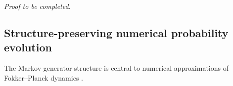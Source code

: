 \documentclass[12pt,a4paper,oneside]{book}
\begin{document}

\noindent\textit{Proof to be completed.}



\subsection{Structure-preserving numerical probability evolution}
\label{subsec:numerical}\label{ch:numerical}
The Markov generator structure is central to numerical approximations of Fokker--Planck dynamics \cite{pavliotis2014}.
\end{document}
